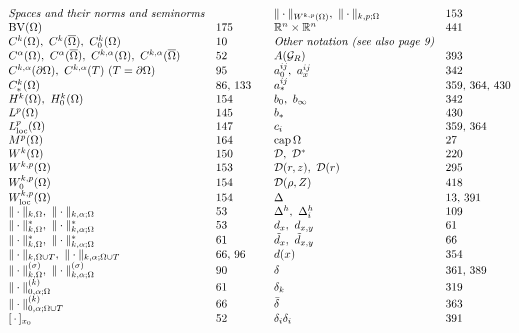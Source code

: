 \[
\begin{array}{@{}ll@{\qquad}ll@{}}
\textit{Spaces and their norms and seminorms} & &
\| \cdot \|_{W^{k,p}(\Omega)},\ \| \cdot \|_{k,p;\Omega} & 153\\
\mathrm{BV}(\Omega) & 175 &
\mathbb{R}^n \times \mathbb{R}^n & 441\\
C^k(\Omega),\ C^k(\overline{\Omega}),\ C_0^k(\Omega) & 10 &
\textit{Other notation (see also page 9)} & \\
C^{\alpha}(\Omega),\ C^{\alpha}(\overline{\Omega}),\ C^{k,\alpha}(\Omega),\ C^{k,\alpha}(\overline{\Omega}) & 52 &
A(\mathcal{G}_{R}) & 393\\
C^{k,\alpha}(\partial\Omega),\ C^{k,\alpha}(T)\ (T=\partial\Omega) & 95 &
a^{ij}_0,\ a^{ij}_x & 342\\
C_*^k(\Omega) & 86,\,133 &
a^{ij}_* & 359,\,364,\,430\\
H^k(\Omega),\ H_0^k(\Omega) & 154 &
b_0,\ b_\infty & 342\\
L^p(\Omega) & 145 &
b_* & 430\\
L^p_{\mathrm{loc}}(\Omega) & 147 &
c_i & 359,\,364\\
M^p(\Omega) & 164 &
\operatorname{cap}\Omega & 27\\
W^k(\Omega) & 150 &
\mathcal{D},\ \mathcal{D}^* & 220\\
W^{k,p}(\Omega) & 153 &
\mathcal{D}(r,z),\ \mathcal{D}(r) & 295\\
W^{k,p}_0(\Omega) & 154 &
\mathcal{D}(\rho,Z) & 418\\
W^{k,p}_{\mathrm{loc}}(\Omega) & 154 &
\Delta & 13,\,391\\
\| \cdot \|_{k,\Omega},\ \| \cdot \|_{k,\alpha;\Omega} & 53 &
\Delta^h,\ \Delta_i^h & 109\\
\| \cdot \|^*_{k,\Omega},\ \| \cdot \|^*_{k,\alpha;\Omega} & 53 &
d_x,\ d_{x,y} & 61\\
\| \cdot \|^*_{k,\Omega},\ \| \cdot \|^*_{k,\alpha;\Omega} & 61 &
\tilde d_x,\ \tilde d_{x,y} & 66\\
\| \cdot \|_{k,\Omega\cup T},\ \| \cdot \|_{k,\alpha;\Omega\cup T} & 66,\,96 &
d(x) & 354\\
\| \cdot \|^{(\sigma)}_{k,\Omega},\ \| \cdot \|^{(\sigma)}_{k,\alpha;\Omega} & 90 &
\delta & 361,\,389\\
\| \cdot \|^{(k)}_{0,\alpha;\Omega} & 61 &
\delta_k & 319\\
\| \cdot \|^{(k)}_{0,\alpha;\Omega\cup T} & 66 &
\bar{\delta} & 363\\
{}[\,\cdot\,]_{x_0} & 52 &
\delta_i\delta_i & 391\\

\end{array}\]
